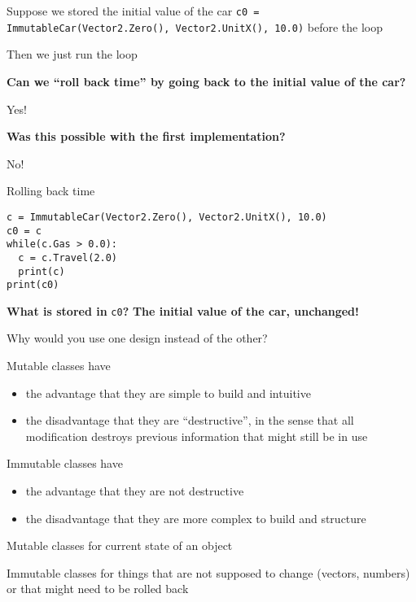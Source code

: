 \documentclass{beamer}
\begin{document}
\begin{slide}{
\item Suppose we stored the initial value of the car \texttt{c0 = ImmutableCar(Vector2.Zero(), Vector2.UnitX(), 10.0)} before the loop
\item Then we just run the loop
\item \textbf{Can we ``roll back time'' by going back to the initial value of the car?}
\pause 
\item Yes!
\item \textbf{Was this possible with the first implementation?}
\pause 
\item No!
}\end{slide}

\begin{frame}[fragile]{Rolling back time}
\begin{lstlisting}
c = ImmutableCar(Vector2.Zero(), Vector2.UnitX(), 10.0)
c0 = c
while(c.Gas > 0.0):
  c = c.Travel(2.0)
  print(c)
print(c0)
\end{lstlisting}
\textbf{What is stored in} \texttt{c0}\textbf{?}
\pause
\textbf{The initial value of the car, unchanged!}
\end{frame}

\begin{slide}{
\item Why would you use one design instead of the other?
\item Mutable classes have 
\begin{itemize}
\item the advantage that they are simple to build and intuitive
\item the disadvantage that they are ``destructive'', in the sense that all modification destroys previous information that might still be in use
\end{itemize}
\item Immutable classes have 
\begin{itemize}
\item the advantage that they are not destructive
\item the disadvantage that they are more complex to build and structure
\end{itemize}
\item Mutable classes for current state of an object
\item Immutable classes for things that are not supposed to change (vectors, numbers) or that might need to be rolled back
}\end{slide}
\end{document}

